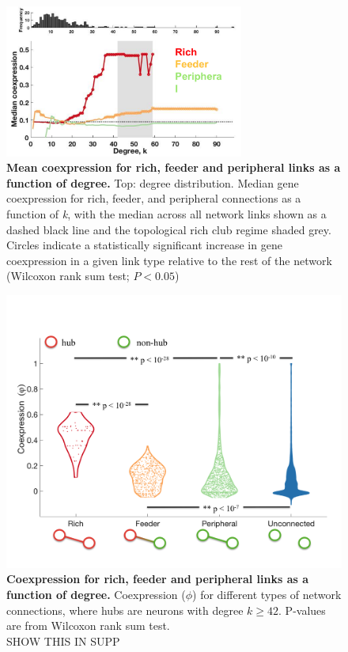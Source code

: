\documentclass[10pt,letterpaper]{article}
\begin{document}
 \begin{figure}[!h]
 \centering
    \includegraphics[width=0.7\textwidth]{RichFeederPeripheral_k}
 \caption{{\bf Mean coexpression for rich, feeder and peripheral links as a function of degree.}
Top: degree distribution. Median gene coexpression for rich, feeder, and peripheral connections as a function of \textit{k}, with the median across all network links shown as a dashed black line and the topological rich club regime shaded grey.
Circles indicate a statistically significant increase in gene coexpression in a given link type relative to the rest of the network (Wilcoxon rank sum test; $P < 0.05$)}
 \label{RCdegree}
 \end{figure}


\begin{figure}[!h]
 \centering
    \includegraphics[width=1\textwidth]{RichFeederPeripheral_k42FINAL}
 \caption{{\bf Coexpression for rich, feeder and peripheral links as a function of degree.}
Coexpression ($\phi$) for different types of network connections, where hubs are neurons with degree $k \geq 42$. P-values are from Wilcoxon rank sum test. \\
SHOW THIS IN SUPP}
 \label{ViolinPlots}
 \end{figure}
\end{document}
